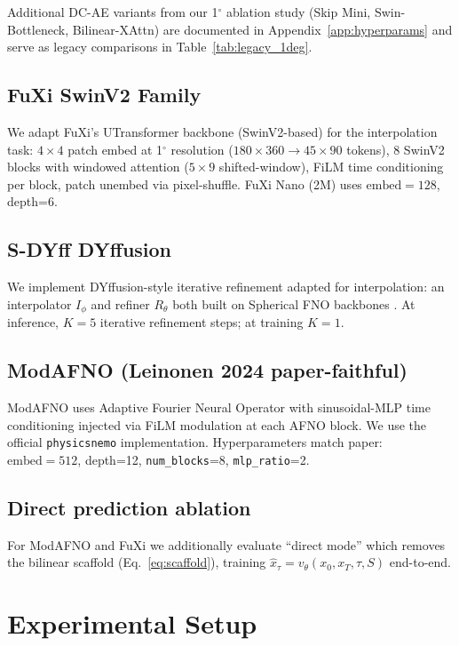 \documentclass[10pt,letterpaper,twocolumn]{article}
\begin{document}
Additional DC-AE variants from our 1$^\circ$ ablation study (Skip Mini,
Swin-Bottleneck, Bilinear-XAttn) are documented in
Appendix~\ref{app:hyperparams} and serve as legacy comparisons in
Table~\ref{tab:legacy_1deg}.

\subsection{FuXi SwinV2 Family}

We adapt FuXi's \cite{chen2023fuxi} UTransformer backbone (SwinV2-based) for
the interpolation task: $4{\times}4$ patch embed at 1$^\circ$ resolution
($180{\times}360 \to 45{\times}90$ tokens), 8 SwinV2 blocks with windowed
attention ($5{\times}9$ shifted-window), FiLM time conditioning per block,
patch unembed via pixel-shuffle. FuXi Nano (2M) uses
$\text{embed}=128$, depth=6.

\subsection{S-DYff DYffusion}

We implement DYffusion-style iterative refinement \cite{cachay2023dyffusion}
adapted for interpolation: an interpolator $I_\phi$ and refiner $R_\theta$ both built on
Spherical FNO backbones \cite{bonev2023sfno}. At inference, $K=5$ iterative
refinement steps; at training $K=1$.

\subsection{ModAFNO (Leinonen 2024 paper-faithful)}

ModAFNO \cite{leinonen2024modafno} uses Adaptive Fourier Neural Operator
\cite{guibas2022afno} with sinusoidal-MLP time conditioning injected via
FiLM modulation at each AFNO block. We use the official \texttt{physicsnemo}
implementation. Hyperparameters match paper: $\text{embed}=512$, depth=12,
\texttt{num\_blocks}=8, \texttt{mlp\_ratio}=2.

\subsection{Direct prediction ablation}

For ModAFNO and FuXi we additionally evaluate ``direct mode'' which removes
the bilinear scaffold (Eq.~\ref{eq:scaffold}), training $\hat{x}_\tau = v_\theta(x_0, x_T, \tau, S)$
end-to-end.

\section{Experimental Setup}
\end{document}
